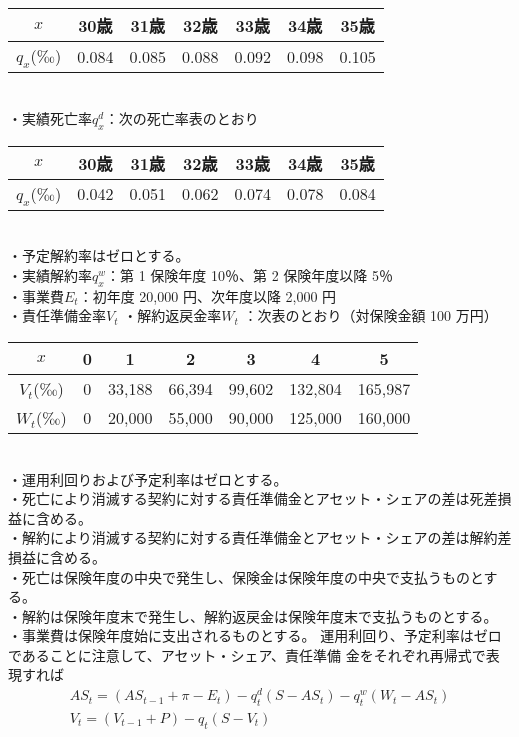 \documentclass[report,gutter=10mm,fore-edge=10mm,uplatex,dvipdfmx]{jlreq}
\begin{document}
\begin{tabular}{|c|c|c|c|c|c|c|}
\hline
 $x$& 30歳& 31歳& 32歳& 33歳& 34歳& 35歳\\\hline
 $q_x$(‰)& 0.084& 0.085& 0.088& 0.092& 0.098& 0.105\\ \hline
\end{tabular}\\
・実績死亡率$q^d_x$：次の死亡率表のとおり

\begin{tabular}{|c|c|c|c|c|c|c|}
\hline
 $x$& 30歳& 31歳& 32歳& 33歳& 34歳& 35歳\\\hline
 $q_x$(‰)& 0.042& 0.051& 0.062& 0.074& 0.078& 0.084\\ \hline
\end{tabular}\\
・予定解約率はゼロとする。\\
・実績解約率$q_x^w$：第 1 保険年度 10％、第 2 保険年度以降 5％\\
・事業費$E_t$：初年度 20,000 円、次年度以降 2,000 円\\
・責任準備金率$V_t$ ・解約返戻金率$W_t$ ：次表のとおり（対保険金額 100 万円）

\begin{tabular}{|c|c|c|c|c|c|c|}
\hline
 $x$& 0& 1& 2& 3& 4& 5\\\hline
 $V_t$(‰)& 0& 33,188&66,394&99,602&132,804&165,987\\ \hline
 $W_t$(‰)& 0& 20,000&55,000&90,000&125,000&160,000\\ \hline
\end{tabular}\\
・運用利回りおよび予定利率はゼロとする。\\
・死亡により消滅する契約に対する責任準備金とアセット・シェアの差は死差損益に含める。\\
・解約により消滅する契約に対する責任準備金とアセット・シェアの差は解約差損益に含める。\\
・死亡は保険年度の中央で発生し、保険金は保険年度の中央で支払うものとする。\\
・解約は保険年度末で発生し、解約返戻金は保険年度末で支払うものとする。\\
・事業費は保険年度始に支出されるものとする。
\answer{}
運用利回り、予定利率はゼロであることに注意して、アセット・シェア、責任準備
金をそれぞれ再帰式で表現すれば
\begin{align}
 AS_t=(AS_{t-1}+\pi-E_t)-q^d_t(S-AS_t)-q^w_t(W_t-AS_t)\label{as-recur}\\
 V_t=(V_{t-1}+P) - q_t(S-V_t)\label{v-recur}
\end{align}
\end{document}
